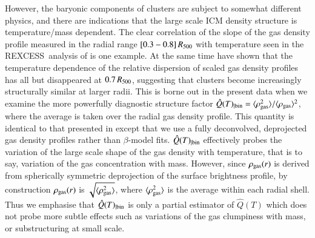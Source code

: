 \documentclass[oldversion]{aa}
\newcommand{\rexcess}{{\gwpfont REXCESS}}
\begin{document}
However, the baryonic components of clusters are subject to somewhat
different physics, and there are indications that the large scale ICM density
structure is temperature/mass dependent. The clear
correlation of the slope of the gas density profile measured in the
radial range $[0.3-0.8]\,R_{500}$ with temperature seen in the \rexcess\
analysis of \citet{croston08} is one example.
At the same time \citeauthor{croston08} have shown that the
temperature dependence of the relative dispersion of scaled gas
density profiles has all but disappeared at $0.7\,R_{500}$, suggesting
that clusters become increasingly structurally similar at larger
radii. This is borne out in the present data when we examine the more powerfully diagnostic structure factor $\hat{Q}(T)_{| \rm bin} = \langle \rho_{\rm gas}^2 \rangle / \langle \rho_{\rm gas} \rangle^2$, where the average is taken over the radial gas density profile. This quantity is identical to that presented in \citet{ae99} except that we use a fully deconvolved, deprojected gas density profiles rather than $\beta$-model fits.  
$\hat{Q}(T)_{| \rm bin}$ effectively probes the variation of the large scale shape of the gas density with temperature, that is to say, variation of the gas concentration with mass. However, since $\rho_{\rm gas} (r)$ is derived from spherically symmetric deprojection of the surface brightness profile, by construction $\rho_{\rm gas} (r)$  is $\sqrt{\langle \rho_{\rm gas}^2 \rangle}$, where $ \langle \rho_{\rm gas}^2 \rangle$ is the average within each radial shell. Thus we emphasise that $\hat{Q}(T)_{| \rm bin}$ is only a partial estimator of $\hat{Q}(T)$ which does not probe more subtle effects such as variations of the gas clumpiness with mass, or substructuring  at small scale. 
\end{document}
